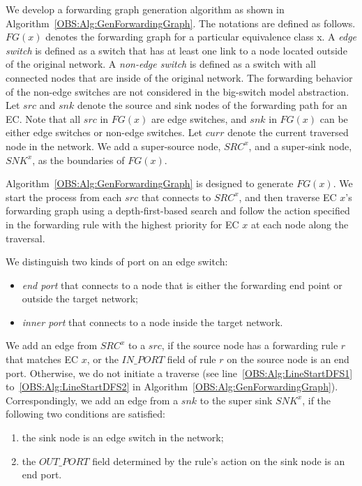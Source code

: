 We develop a forwarding graph generation algorithm as shown in Algorithm~\ref{OBS:Alg:GenForwardingGraph}.
The notations are defined as follows.
$FG(x)$ denotes the forwarding graph for a particular equivalence class x.
A \textit{edge switch} is defined as a switch that has at least one link to a node located outside of the original network. 
A \textit{non-edge switch} is defined as a switch with all connected nodes that are inside of the original network.
The forwarding behavior of the non-edge switches are not considered in the big-switch model abstraction.
Let $src$ and $snk$ denote the source and sink nodes of the forwarding path for an EC.
Note that all $src$ in $FG(x)$ are edge switches,
and $snk$ in $FG(x)$ can be either edge switches or non-edge switches.
Let $curr$ denote the current traversed node in the network.
We add a super-source node, $SRC^x$, and a super-sink node, $SNK^x$, as the boundaries of $FG(x)$.

Algorithm~\ref{OBS:Alg:GenForwardingGraph} is designed to generate $FG(x)$.
We start the process from each $src$ that connects to $SRC^x$,
and then traverse EC $x$'s forwarding graph using a depth-first-based search and
follow the action specified in the forwarding rule with the highest priority for EC $x$ at each node along the traversal.


We distinguish two kinds of port on an edge switch:
\begin{itemize}
    \item \textit{end port} that connects to a node that is either the forwarding end point or outside the target network;
    \item \textit{inner port} that connects to a node inside the target network.
\end{itemize}

We add an edge from $SRC^x$ to a $src$, if the source node has a forwarding rule $r$ that matches EC $x$, or the $IN\_PORT$ field of rule $r$ on the source node is an end port.
Otherwise, we do not initiate a traverse (see line~\ref{OBS:Alg:LineStartDFS1} to~\ref{OBS:Alg:LineStartDFS2} in Algorithm~\ref{OBS:Alg:GenForwardingGraph}).
Correspondingly, we add an edge from a $snk$ to the super sink $SNK^x$, if the following two conditions are satisfied:
\begin{enumerate}
    \item the sink node is an edge switch in the network;
    \item the $OUT\_PORT$ field determined by the rule's action on the sink node is an end port.
\end{enumerate}

